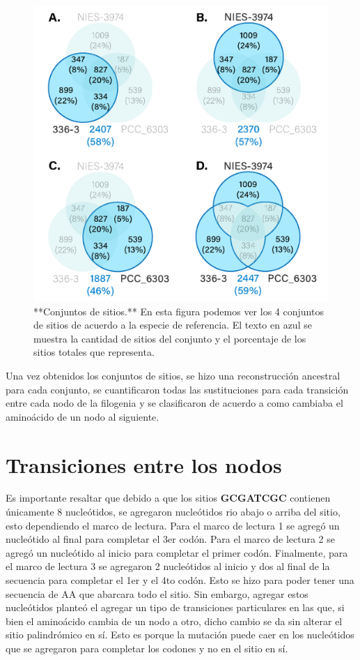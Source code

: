 \documentclass[
]{book}
\begin{document}
\begin{figure}

{\centering \includegraphics[width=0.8\linewidth]{Clados/Calothrix_B/figures/All_venn_calothrix} 

}

\caption{**Conjuntos de sitios.** En esta figura podemos ver los 4 conjuntos de sitios de acuerdo a la especie de referencia. El texto en azul se muestra la cantidad de sitios del conjunto y el porcentaje de los sitios totales que representa.}\label{fig:FIG3}
\end{figure}

Una vez obtenidos los conjuntos de sitios, se hizo una reconstrucción ancestral para cada conjunto, se cuantificaron todas las sustituciones para cada transición entre cada nodo de la filogenia y se clasificaron de acuerdo a como cambiaba el aminoácido de un nodo al siguiente.

\hypertarget{transiciones-entre-los-nodos}{%
\section{Transiciones entre los nodos}\label{transiciones-entre-los-nodos}}

Es importante resaltar que debido a que los sitios \textbf{GCGATCGC} contienen únicamente 8 nucleótidos, se agregaron nucleótidos rio abajo o arriba del sitio, esto dependiendo el marco de lectura. Para el marco de lectura 1 se agregó un nucleótido al final para completar el 3er codón. Para el marco de lectura 2 se agregó un nucleótido al inicio para completar el primer codón. Finalmente, para el marco de lectura 3 se agregaron 2 nucleótidos al inicio y dos al final de la secuencia para completar el 1er y el 4to codón. Esto se hizo para poder tener una secuencia de AA que abarcara todo el sitio. Sin embargo, agregar estos nucleótidos planteó el agregar un tipo de transiciones particulares en las que, si bien el aminoácido cambia de un nodo a otro, dicho cambio se da sin alterar el sitio palindrómico en sí. Esto es porque la mutación puede caer en los nucleótidos que se agregaron para completar los codones y no en el sitio en sí.
\end{document}
